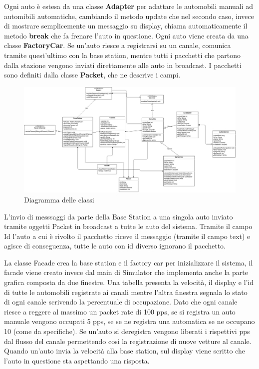 \documentclass[a4paper,10pt]{article}
\begin{document}
Ogni auto è estesa da una classe \textbf{Adapter} per adattare le automobili manuali ad automibili automatiche, cambiando il metodo update che nel secondo caso, invece di mostrare semplicemente un messaggio su display, chiama automaticamente il metodo \textbf{break} che fa frenare l'auto in questione. Ogni auto viene creata da una classe \textbf{FactoryCar}. Se un'auto riesce a registrarsi su un canale, comunica tramite quest'ultimo con la base station, mentre tutti i pacchetti che partono dalla stazione vengono inviati direttamente alle auto in broadcast. I pacchetti sono definiti dalla classe \textbf{Packet}, che ne descrive i campi.

\begin{figure}[htbp]
\includegraphics[scale=0.24]{class_diagram.jpg}
\caption{Diagramma delle classi}
\label{class_dig}
\end{figure}

L'invio di messsaggi da parte della Base Station a una singola auto inviato tramite oggetti Packet in broadcast a tutte le auto del sistema.
Tramite il campo Id l'auto a cui è rivolto il pacchetto riceve il messaggio (tramite il campo text) e agisce di conseguenza, tutte le auto con id diverso ignorano il pacchetto.

La classe Facade crea la base station e il factory car per inizializzare il sistema, il facade viene creato invece dal main di Simulator che implementa anche la parte grafica composta da due finestre.
Una tabella presenta la velocità, il display e l'id di tutte le automobili registrate ai canali mentre l'altra finestra segnala lo stato di ogni canale scrivendo la percentuale di occupazione. Dato che ogni canale riesce a reggere al massimo un packet rate di 100 pps, se si registra un auto manuale vengono occupati 5 pps, se se ne registra una automatica se ne occupano 10 (come da specifiche). 
Se un'auto si deregistra vengono liberati i rispettivi pps dal flusso del canale permettendo così la registrazione di nuove vetture al canale.
Quando un'auto invia la velocità alla base station, sul display viene scritto che l'auto in questione sta aspettando una risposta. 
\end{document}
